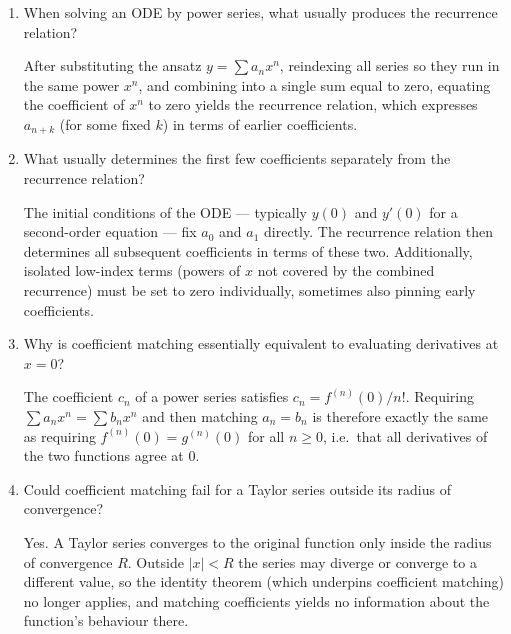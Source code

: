 \documentclass{essay}
\begin{document}
\begin{enumerate}[leftmargin=*, itemsep=8pt]
  \item When solving an ODE by power series, what usually produces
    the recurrence relation?
    \begin{answer}
      After substituting the ansatz $y = \sum a_n x^n$, reindexing
      all series so they
      run in the same power $x^n$, and combining into a single sum
      equal to zero,
      equating the coefficient of $x^n$ to zero yields the recurrence
      relation, which
      expresses $a_{n+k}$ (for some fixed $k$) in terms of earlier coefficients.
    \end{answer}

  \item What usually determines the first few coefficients separately
    from the recurrence relation?
    \begin{answer}
      The initial conditions of the ODE --- typically $y(0)$ and $y'(0)$ for a
      second-order equation --- fix $a_0$ and $a_1$ directly. The recurrence
      relation then determines all subsequent coefficients in terms
      of these two.
      Additionally, isolated low-index terms (powers of $x$ not covered by the
      combined recurrence) must be set to zero individually,
      sometimes also pinning
      early coefficients.
    \end{answer}

  \item Why is coefficient matching essentially equivalent to
    evaluating derivatives at \(x=0\)?
    \begin{answer}
      The coefficient $c_n$ of a power series satisfies $c_n = f^{(n)}(0)/n!$.
      Requiring $\sum a_n x^n = \sum b_n x^n$ and then matching $a_n = b_n$ is
      therefore exactly the same as requiring $f^{(n)}(0) = g^{(n)}(0)$ for all
      $n \ge 0$, i.e.\ that all derivatives of the two functions agree at $0$.
    \end{answer}

  \item Could coefficient matching fail for a Taylor series outside
    its radius of convergence?
    \begin{answer} Yes. A Taylor series converges to the original
      function only inside the radius of convergence $R$. Outside
      $|x| < R$ the series may diverge or converge to a different
      value, so the identity theorem (which underpins coefficient
      matching) no longer applies, and matching coefficients yields
      no information about the function's behaviour there.
    \end{answer}


\end{enumerate}
\end{document}

